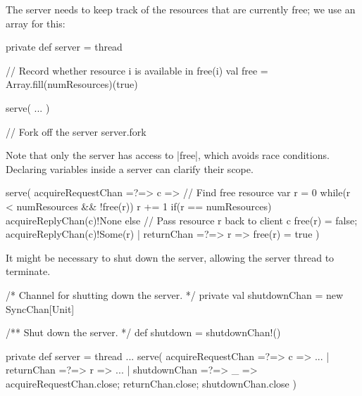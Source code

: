 
\begin{slide}

The server needs to keep track of the resources that are currently free; we
use an array  for this:
%
\begin{scala}
  private def server = thread{
    // Record whether resource i is available in free(i)
    val free = Array.fill(numResources)(true)

    serve( 
      ...
    )
  }

  // Fork off the server
  server.fork
\end{scala}
%
Note that only the server has access to |free|, which avoids race
conditions.  Declaring variables inside a server can clarify their scope. 
\end{slide}


\begin{slide}

\begin{scala}
    serve(
      acquireRequestChan =?=> { c => 
	// Find free resource
	var r = 0
	while(r < numResources && !free(r)) r += 1
	if(r == numResources) acquireReplyChan(c)!None
        else{  // Pass resource r back to client c
	  free(r) = false; acquireReplyChan(c)!Some(r)
        }
      }
      | returnChan =?=> { r => free(r) = true }
    )
\end{scala}
\end{slide}





\begin{slide}

It might be necessary to shut down the server, allowing the server thread to
terminate. 
%
\begin{scala}
  /* Channel for shutting down the server. */
  private val shutdownChan = new SyncChan[Unit]

  /** Shut down the server. */
  def shutdown = shutdownChan!()
  
  private def server = thread{
    ...
    serve(
      acquireRequestChan =?=> { c => ... }
      | returnChan =?=> { r => ... }
      | shutdownChan =?=> { _ =>
          acquireRequestChan.close; returnChan.close; shutdownChan.close }
    )
  }
\end{scala}  
\end{slide}
